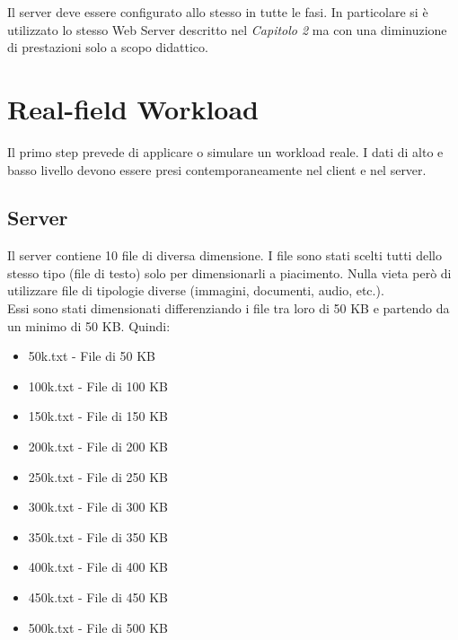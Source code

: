 Il server deve essere configurato allo stesso in tutte le fasi. In particolare si è utilizzato lo stesso Web Server descritto nel \textit{Capitolo 2} ma con una diminuzione di prestazioni solo a scopo didattico.

\section{Real-field Workload}
Il primo step prevede di applicare o simulare un workload reale. I dati di alto e basso livello devono essere presi contemporaneamente nel client e nel server.
\subsection{Server}
Il server contiene 10 file di diversa dimensione. I file sono stati scelti tutti dello stesso tipo (file di testo) solo per dimensionarli a piacimento. Nulla vieta però di utilizzare file di tipologie diverse (immagini, documenti, audio, etc.).
\\Essi sono stati dimensionati differenziando i file tra loro di 50 KB e partendo da un minimo di 50 KB. Quindi:
\begin{itemize}
	\item 50k.txt - File di 50 KB
	\item 100k.txt - File di 100 KB
	\item 150k.txt - File di 150 KB	
	\item 200k.txt - File di 200 KB
	\item 250k.txt - File di 250 KB	
	\item 300k.txt - File di 300 KB
	\item 350k.txt - File di 350 KB	
	\item 400k.txt - File di 400 KB	
	\item 450k.txt - File di 450 KB	
	\item 500k.txt - File di 500 KB	
\end{itemize}

